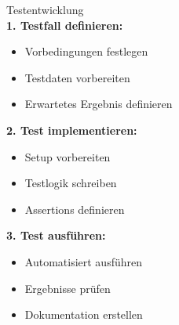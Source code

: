 \begin{KR}{Testentwicklung}\\
\textbf{1. Testfall definieren:}
\begin{itemize}
    \item Vorbedingungen festlegen
    \item Testdaten vorbereiten
    \item Erwartetes Ergebnis definieren
\end{itemize}

\textbf{2. Test implementieren:}
\begin{itemize}
    \item Setup vorbereiten
    \item Testlogik schreiben
    \item Assertions definieren
\end{itemize}

\textbf{3. Test ausführen:}
\begin{itemize}
    \item Automatisiert ausführen
    \item Ergebnisse prüfen
    \item Dokumentation erstellen
\end{itemize}
\end{KR}


